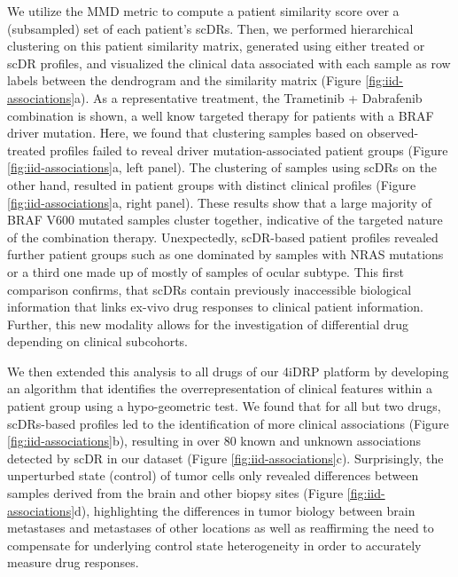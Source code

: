 We utilize the MMD metric to compute a patient similarity score over a (subsampled) set of each patient's scDRs.
Then, we performed hierarchical clustering on this patient similarity matrix, generated using either treated or scDR profiles,
and visualized the clinical data associated with each sample as row labels between the dendrogram and the similarity matrix (Figure \ref{fig:iid-associations}a).
As a representative treatment, the Trametinib + Dabrafenib combination is shown, a well know targeted therapy for patients with a BRAF driver mutation.
Here, we found that clustering samples based on observed-treated profiles failed to reveal driver mutation-associated patient groups (Figure \ref{fig:iid-associations}a, left panel).
The clustering of samples using scDRs on the other hand, resulted in patient groups with distinct clinical profiles (Figure \ref{fig:iid-associations}a, right panel).
These results show that a large majority of BRAF V600 mutated samples cluster together, indicative of the targeted nature of the combination therapy.
 Unexpectedly, scDR-based patient profiles revealed further patient groups such as one dominated by samples with NRAS mutations or a third one made up of mostly of samples of ocular subtype.
 This first comparison confirms, that scDRs contain previously inaccessible biological information that links ex-vivo drug responses to clinical patient information.
 Further, this new modality allows for the investigation of differential drug depending on clinical subcohorts. 

We then extended this analysis to all drugs of our 4iDRP platform by developing an algorithm that identifies the overrepresentation of clinical features within a patient group using a hypo-geometric test.
 We found that for all but two drugs, scDRs-based profiles led to the identification of more clinical associations (Figure \ref{fig:iid-associations}b),
 resulting in over 80 known and unknown associations detected by scDR in our dataset (Figure \ref{fig:iid-associations}c).
 Surprisingly, the unperturbed state (control) of tumor cells only revealed differences between samples derived from the brain and other biopsy sites (Figure \ref{fig:iid-associations}d),
 highlighting the differences in tumor biology between brain metastases and metastases of other locations \cite{eichler2011}
 as well as reaffirming the need to compensate for underlying control state heterogeneity in order to accurately measure drug responses.

